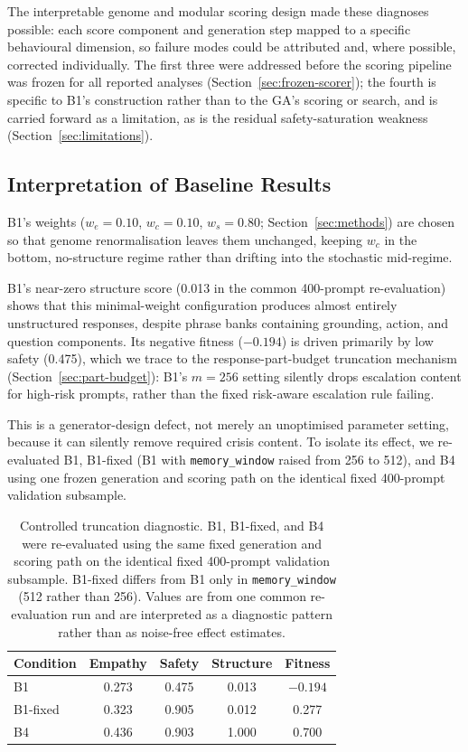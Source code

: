 \documentclass[mathematics,article,submit,xetex,moreauthors]{Definitions/mdpi}
\begin{document}
The interpretable genome and modular scoring design made these diagnoses
possible: each score component and generation step mapped to a specific
behavioural dimension, so failure modes could be attributed and, where
possible, corrected individually. The first three were addressed before the
scoring pipeline was frozen for all reported analyses
(Section~\ref{sec:frozen-scorer}); the fourth is specific to B1's construction
rather than to the GA's scoring or search, and is carried forward as a
limitation, as is the residual safety-saturation weakness
(Section~\ref{sec:limitations}).


\subsection{Interpretation of Baseline Results}
\label{sec:interp-baseline}

B1's weights ($w_e=0.10$, $w_c=0.10$, $w_s=0.80$; Section~\ref{sec:methods})
are chosen so that genome renormalisation leaves them unchanged, keeping
$w_c$ in the bottom, no-structure regime rather than drifting into the
stochastic mid-regime.

B1's near-zero structure score (0.013 in the common 400-prompt
re-evaluation) shows that this minimal-weight configuration produces almost
entirely unstructured responses, despite phrase banks containing grounding,
action, and question components. Its negative fitness ($-0.194$) is driven
primarily by low safety (0.475), which we trace to the response-part-budget
truncation mechanism (Section~\ref{sec:part-budget}): B1's $m=256$ setting
silently drops escalation content for high-risk prompts, rather than the
fixed risk-aware escalation rule failing.

This is a generator-design defect, not merely an unoptimised parameter
setting, because it can silently remove required crisis content. To isolate
its effect, we re-evaluated B1, B1-fixed (B1 with \texttt{memory\_window}
raised from 256 to 512), and B4 using one frozen generation and scoring path
on the identical fixed 400-prompt validation subsample.

\begin{table}[H]
  \centering
\small
  \caption{Controlled truncation diagnostic. B1, B1-fixed, and B4 were
  re-evaluated using the same fixed generation and scoring path on the
  identical fixed 400-prompt validation subsample. B1-fixed differs from B1
  only in \texttt{memory\_window} (512 rather than 256). Values are from one
  common re-evaluation run and are interpreted as a diagnostic pattern rather
  than as noise-free effect estimates.}
  \label{tab:truncation-diagnostic}
  \begin{tabular}{lcccc}
    \toprule
    \textbf{Condition} & \textbf{Empathy} & \textbf{Safety} &
    \textbf{Structure} & \textbf{Fitness} \\
    \midrule
    B1       & 0.273 & 0.475 & 0.013 & $-0.194$ \\
    B1-fixed & 0.323 & 0.905 & 0.012 & 0.277 \\
    B4       & 0.436 & 0.903 & 1.000 & 0.700 \\
    \bottomrule
  \end{tabular}
\end{table}
\end{document}
